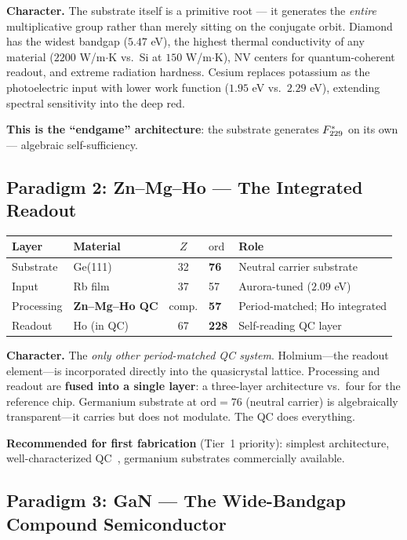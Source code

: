 \noindent \textbf{Character.} The substrate itself is a primitive root --- it generates the \emph{entire} multiplicative group rather than merely sitting on the conjugate orbit. Diamond has the widest bandgap ($5.47$ eV), the highest thermal conductivity of any material ($2200$ W/m$\cdot$K vs.\ Si at $150$ W/m$\cdot$K), NV centers for quantum-coherent readout, and extreme radiation hardness. Cesium replaces potassium as the photoelectric input with lower work function ($1.95$ eV vs.\ $2.29$ eV), extending spectral sensitivity into the deep red.

\textbf{This is the ``endgame'' architecture}: the substrate generates $F_{229}^*$ on its own --- algebraic self-sufficiency.

\subsection{Paradigm 2: Zn--Mg--Ho --- The Integrated Readout}

\begin{center}
\begin{tabular}{@{}llcll@{}}
\toprule
\textbf{Layer} & \textbf{Material} & $Z$ & $\mathrm{ord}$ & \textbf{Role} \\
\midrule
Substrate & Ge(111) & 32 & \textbf{76} & Neutral carrier substrate \\
Input & Rb film & 37 & 57 & Aurora-tuned ($2.09$ eV) \\
Processing & \textbf{Zn--Mg--Ho QC} & comp. & \textbf{57} & Period-matched; Ho integrated \\
Readout & Ho (in QC) & 67 & \textbf{228} & Self-reading QC layer \\
\bottomrule
\end{tabular}
\end{center}

\noindent \textbf{Character.} The \emph{only other period-matched QC system}. Holmium---the readout element---is incorporated directly into the quasicrystal lattice. Processing and readout are \textbf{fused into a single layer}: a three-layer architecture vs.\ four for the reference chip. Germanium substrate at $\mathrm{ord} = 76$ (neutral carrier) is algebraically transparent---it carries but does not modulate. The QC does everything.

\textbf{Recommended for first fabrication} (Tier~1 priority): simplest architecture, well-characterized QC~\cite{Tsai_ZnMgHo}, germanium substrates commercially available.

\subsection{Paradigm 3: GaN --- The Wide-Bandgap Compound Semiconductor}


